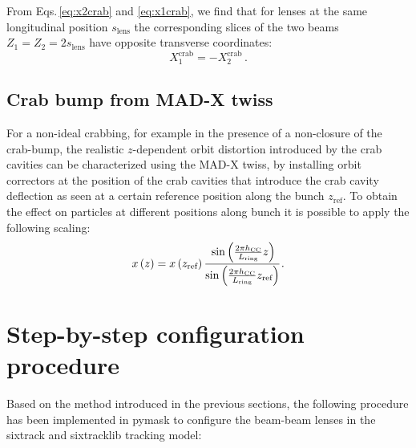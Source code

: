 From Eqs.\,\eqref{eq:x2crab} and \eqref{eq:x1crab}, we find that for lenses at the same longitudinal position $s_\text{lens}$ the corresponding slices of the two beams $Z_1 = Z_2 = 2 s_\text{lens}$ have opposite transverse coordinates:
\begin{equation}
X^\text{crab}_1= -X^\text{crab}_2
\, .
\end{equation}

\subsection{Crab bump from MAD-X twiss}

For a non-ideal crabbing, for example in the presence of a non-closure of the crab-bump, the realistic $z$-dependent  orbit distortion introduced by the crab cavities can be characterized using the MAD-X twiss, by installing orbit correctors at the position of the crab cavities that introduce the crab cavity deflection as seen at a certain reference position along the bunch $z_\text{ref}$. 
To obtain the effect on particles at different positions along bunch it is possible to apply the following scaling:
\begin{equation}
x\left(z\right) = x\left(z_\text{ref}\right)
 \cfrac
 {\sin\left(  \frac{2 \pi h_\text{CC}}{L_\text{ring}} z\right)}
 {\sin\left(  \frac{2 \pi h_\text{CC}}{L_\text{ring}} z_\text{ref}\right)} 
 \, .
\end{equation}

\section{Step-by-step configuration procedure}

Based on the method introduced in the previous sections, the following procedure has been implemented in pymask to configure the beam-beam lenses in the sixtrack and sixtracklib tracking model:

